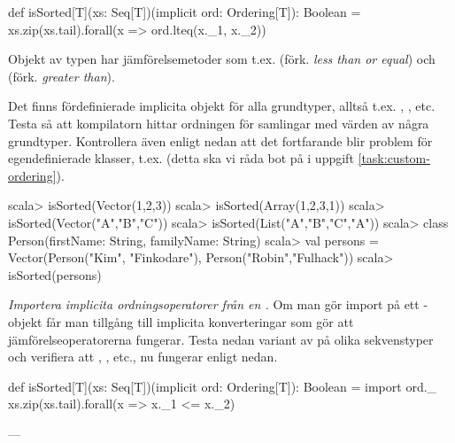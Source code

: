 \begin{CodeSmall}
def isSorted[T](xs: Seq[T])(implicit ord: Ordering[T]): Boolean =
  xs.zip(xs.tail).forall(x => ord.lteq(x._1, x._2))
\end{CodeSmall}

Objekt av typen  har jämförelsemetoder som t.ex.  (förk. \emph{less than or equal}) och  (förk. \emph{greater than}).

Det finns fördefinierade implicita objekt  för alla grundtyper, alltså t.ex. , , etc.
Testa så att kompilatorn hittar ordningen för samlingar med värden av några grundtyper. Kontrollera även enligt nedan att det fortfarande blir problem för egendefinierade klasser, t.ex.   (detta ska vi råda bot på i uppgift \ref{task:custom-ordering}).
\begin{REPL}
scala> isSorted(Vector(1,2,3))
scala> isSorted(Array(1,2,3,1))
scala> isSorted(Vector("A","B","C"))
scala> isSorted(List("A","B","C","A"))
scala> class Person(firstName: String, familyName: String)
scala> val persons = Vector(Person("Kim", "Finkodare"), Person("Robin","Fulhack"))
scala> isSorted(persons)
\end{REPL}

\Subtask \emph{Importera implicita ordningsoperatorer från en .} Om man gör import på ett -objekt får man tillgång till implicita konverteringar som gör att jämförelseoperatorerna fungerar. Testa nedan variant av  på olika sekvenstyper och verifiera att \code{<=}, \code{>}, etc., nu fungerar enligt nedan.
\begin{CodeSmall}
def isSorted[T](xs: Seq[T])(implicit ord: Ordering[T]): Boolean = {
  import ord._
  xs.zip(xs.tail).forall(x => x._1 <= x._2)
}
\end{CodeSmall}


\SOLUTION


\TaskSolved \what ---

\QUESTEND







\QUESTBEGIN

\Task \label{task:custom-ordering} \what~

